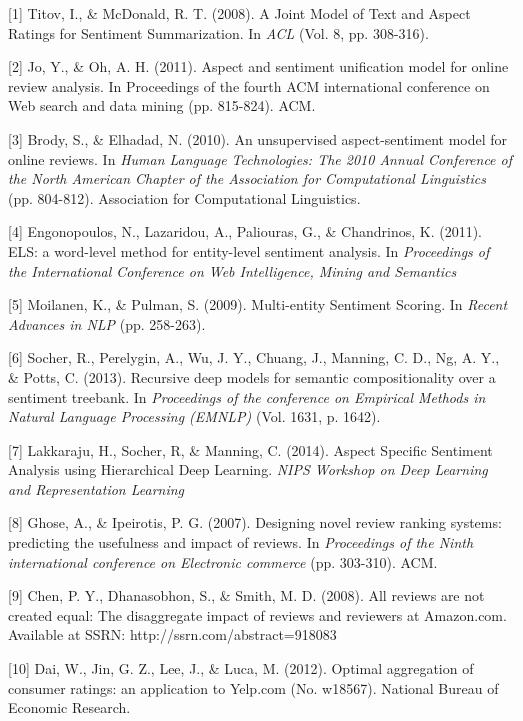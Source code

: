 \documentclass{article} %
\begin{document}
\small{

[1] Titov, I., \& McDonald, R. T. (2008). A Joint Model of Text and Aspect Ratings for Sentiment Summarization. In {\it ACL} (Vol. 8, pp. 308-316).

[2] Jo, Y., \& Oh, A. H. (2011). Aspect and sentiment unification model for online review analysis. In Proceedings of the fourth ACM international conference on Web search and data mining (pp. 815-824). ACM.

[3] Brody, S., \& Elhadad, N. (2010). An unsupervised aspect-sentiment model for online reviews. In {\it Human Language Technologies: The 2010 Annual Conference of the North American Chapter of the Association for Computational Linguistics} (pp. 804-812). Association for Computational Linguistics.

[4] Engonopoulos, N., Lazaridou, A., Paliouras, G., \& Chandrinos, K. (2011). ELS: a word-level method for entity-level sentiment analysis. In {\it Proceedings of the International Conference on Web Intelligence, Mining and Semantics}


[5] Moilanen, K., \& Pulman, S. (2009). Multi-entity Sentiment Scoring. In {\it Recent Advances in NLP} (pp. 258-263).

[6] Socher, R., Perelygin, A., Wu, J. Y., Chuang, J., Manning, C. D., Ng, A. Y., \& Potts, C. (2013). Recursive deep models for semantic compositionality over a sentiment treebank. In {\it Proceedings of the conference on Empirical Methods in Natural Language Processing (EMNLP)} (Vol. 1631, p. 1642).

[7] Lakkaraju, H., Socher, R, \& Manning, C. (2014). Aspect Specific Sentiment Analysis using Hierarchical Deep Learning. {\it NIPS Workshop on Deep Learning and Representation Learning}



[8] Ghose, A., \& Ipeirotis, P. G. (2007). Designing novel review ranking systems: predicting the usefulness and impact of reviews. In {\it Proceedings of the Ninth international conference on Electronic commerce} (pp. 303-310). ACM.

[9] Chen, P. Y., Dhanasobhon, S., \& Smith, M. D. (2008). All reviews are not created equal: The disaggregate impact of reviews and reviewers at Amazon.com. Available at SSRN: http://ssrn.com/abstract=918083 

[10] Dai, W., Jin, G. Z., Lee, J., \& Luca, M. (2012). Optimal aggregation of consumer ratings: an application to Yelp.com (No. w18567). National Bureau of Economic Research. 


}
\end{document}
